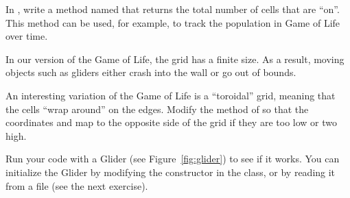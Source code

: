 \begin{exercise}
In , write a method named  that returns the total number of cells that are ``on''.
This method can be used, for example, to track the population in Game of Life over time.
\end{exercise}


\begin{exercise}
In our version of the Game of Life, the grid has a finite size.
As a result, moving objects such as gliders either crash into the wall or go out of bounds.

An interesting variation of the Game of Life is a ``toroidal'' grid, meaning that the cells ``wrap around'' on the edges.
Modify the  method of  so that the coordinates  and  map to the opposite side of the grid if they are too low or two high.

Run your code with a Glider (see Figure~\ref{fig:glider}) to see if it works.
You can initialize the Glider by modifying the constructor in the  class, or by reading it from a file (see the next exercise).
\end{exercise}





